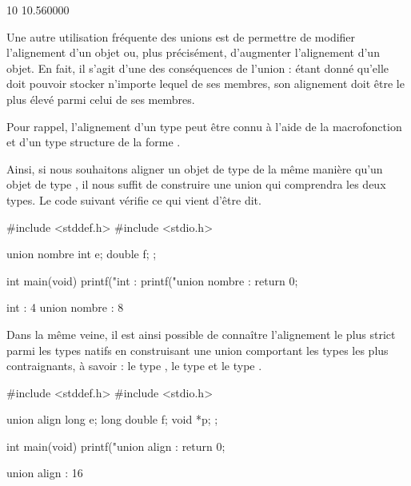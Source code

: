 \begin{C}
10
10.560000
\end{C}

Une autre utilisation fréquente des unions est de permettre de modifier
l'alignement d'un objet ou, plus précisément, d'augmenter l'alignement
d'un objet. En fait, il s'agit d'une des conséquences de l'union : étant
donné qu'elle doit pouvoir stocker n'importe lequel de ses membres, son
alignement doit être le plus élevé parmi celui de ses membres.

\begin{infobox}
  Pour rappel, l'alignement d'un type
peut être connu à l'aide de la macrofonction  et d'un
type structure de la forme .
\end{infobox}


Ainsi, si nous souhaitons aligner un objet de type  de la
même manière qu'un objet de type , il nous suffit de
construire une union qui comprendra les deux types. Le code suivant
vérifie ce qui vient d'être dit.

\begin{C}
#include <stddef.h>
#include <stdio.h>

union nombre
{
    int e;
    double f;
};


int main(void)
{
    printf("int : %
    printf("union nombre : %
    return 0;
}
\end{C}

\begin{C}
int : 4
union nombre : 8
\end{C}

Dans la même veine, il est ainsi possible de connaître l'alignement le
plus strict parmi les types natifs en construisant une union comportant
les types les plus contraignants, à savoir : le type , le
type  et le type .

\begin{C}
#include <stddef.h>
#include <stdio.h>

union align
{
    long e;
    long double f;
    void *p;
};


int main(void)
{
    printf("union align : %
    return 0;
}
\end{C}

\begin{C}
union align : 16
\end{C}

